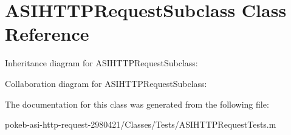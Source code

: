 \hypertarget{interface_a_s_i_h_t_t_p_request_subclass}{
\section{\-A\-S\-I\-H\-T\-T\-P\-Request\-Subclass \-Class \-Reference}
\label{interface_a_s_i_h_t_t_p_request_subclass}
}


\-Inheritance diagram for \-A\-S\-I\-H\-T\-T\-P\-Request\-Subclass\-:


\-Collaboration diagram for \-A\-S\-I\-H\-T\-T\-P\-Request\-Subclass\-:


\-The documentation for this class was generated from the following file\-:\begin{DoxyCompactItemize}
\item 
pokeb-\/asi-\/http-\/request-\/2980421/\-Classes/\-Tests/\-A\-S\-I\-H\-T\-T\-P\-Request\-Tests.\-m\end{DoxyCompactItemize}
